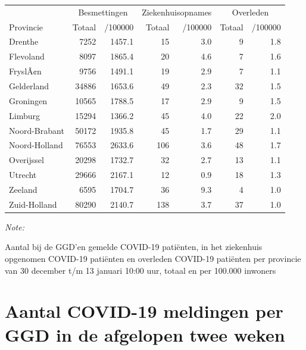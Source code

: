 \documentclass[
  english,
  man,floatsintext]{apa6}
\begin{document}
\begin{table}
\centering
\begin{threeparttable}
\begin{tabular}{lrrrrrr}
\toprule
\multicolumn{1}{c}{ } & \multicolumn{2}{c}{Besmettingen} & \multicolumn{2}{c}{Ziekenhuisopnames} & \multicolumn{2}{c}{Overleden} \\
\cmidrule(l{3pt}r{3pt}){2-3} \cmidrule(l{3pt}r{3pt}){4-5} \cmidrule(l{3pt}r{3pt}){6-7}
Provincie & Totaal & /100000 & Totaal & /100000 & Totaal & /100000\\
\midrule
Drenthe & 7252 & 1457.1 & 15 & 3.0 & 9 & 1.8\\
Flevoland & 8097 & 1865.4 & 20 & 4.6 & 7 & 1.6\\
FryslÃ¢n & 9756 & 1491.1 & 19 & 2.9 & 7 & 1.1\\
Gelderland & 34886 & 1653.6 & 49 & 2.3 & 32 & 1.5\\
Groningen & 10565 & 1788.5 & 17 & 2.9 & 9 & 1.5\\
Limburg & 15294 & 1366.2 & 45 & 4.0 & 22 & 2.0\\
Noord-Brabant & 50172 & 1935.8 & 45 & 1.7 & 29 & 1.1\\
Noord-Holland & 76553 & 2633.6 & 106 & 3.6 & 48 & 1.7\\
Overijssel & 20298 & 1732.7 & 32 & 2.7 & 13 & 1.1\\
Utrecht & 29666 & 2167.1 & 12 & 0.9 & 18 & 1.3\\
Zeeland & 6595 & 1704.7 & 36 & 9.3 & 4 & 1.0\\
Zuid-Holland & 80290 & 2140.7 & 138 & 3.7 & 37 & 1.0\\
\bottomrule
\end{tabular}
\begin{tablenotes}
\item \textit{Note: } 
\item Aantal bij de GGD’en gemelde COVID-19 patiënten, in het ziekenhuis opgenomen COVID-19 patiënten en overleden COVID-19 patiënten per provincie van 30 december t/m 13 januari 10:00 uur, totaal en per 100.000 inwoners
\end{tablenotes}
\end{threeparttable}
\end{table}

\newpage

\hypertarget{aantal-covid-19-meldingen-per-ggd-in-de-afgelopen-twee-weken}{%
\section{Aantal COVID-19 meldingen per GGD in de afgelopen twee weken}\label{aantal-covid-19-meldingen-per-ggd-in-de-afgelopen-twee-weken}}
\end{document}
